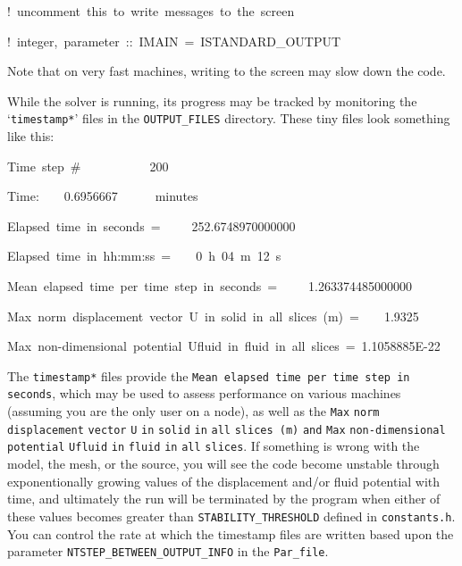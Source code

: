 \documentclass[oneside,english]{book}
\newenvironment{lyxcode}
{\begin{list}{}{
\setlength{\rightmargin}{\leftmargin}
\setlength{\listparindent}{0pt}%
\raggedright
\setlength{\itemsep}{0pt}
\setlength{\parsep}{0pt}
\normalfont\ttfamily}%
 \item[]}
{\end{list}}
\begin{document}
\begin{lyxcode}
!~uncomment~this~to~write~messages~to~the~screen~

!~integer,~parameter~::~IMAIN~=~ISTANDARD\_OUTPUT~
\end{lyxcode}
Note that on very fast machines, writing to the screen may slow down
the code.

While the solver is running, its progress may be tracked by monitoring
the `\texttt{timestamp{*}}' files in the \texttt{OUTPUT\_FILES} directory.
These tiny files look something like this:

\begin{lyxcode}
Time~step~\#~~~~~~~~~~~200~

Time:~~~~0.6956667~~~~~~minutes~

Elapsed~time~in~seconds~=~~~~~252.6748970000000~

Elapsed~time~in~hh:mm:ss~=~~~~0~h~04~m~12~s~

Mean~elapsed~time~per~time~step~in~seconds~=~~~~~1.263374485000000~

Max~norm~displacement~vector~U~in~solid~in~all~slices~(m)~=~~~~1.9325~

Max~non-dimensional~potential~Ufluid~in~fluid~in~all~slices~=~1.1058885E-22~
\end{lyxcode}
The \texttt{timestamp{*}} files provide the \texttt{Mean elapsed time
per time step in seconds}, which may be used to assess performance
on various machines (assuming you are the only user on a node), as
well as the \texttt{\small Max}{\small{} }\texttt{\small norm}{\small{}
}\texttt{\small displacement}{\small{} }\texttt{\small vector}{\small{}
}\texttt{\small U}{\small{} }\texttt{\small in}{\small{} }\texttt{\small solid}{\small{}
}\texttt{\small in}{\small{} }\texttt{\small all}{\small{} }\texttt{\small slices~(m)}{\small{}
}\texttt{\small and}{\small{} }\texttt{\small Max}{\small{} }\texttt{\small non-dimensional}{\small{}
}\texttt{\small potential}{\small{} }\texttt{\small Ufluid}{\small{}
}\texttt{\small in}{\small{} }\texttt{\small fluid}{\small{} }\texttt{\small in}{\small{}
}\texttt{\small all}{\small{} }\texttt{\small slices}. If something
is wrong with the model, the mesh, or the source, you will see the
code become unstable through exponentionally growing values of the
displacement and/or fluid potential with time, and ultimately the
run will be terminated by the program when either of these values
becomes greater than \texttt{STABILITY\_THRESHOLD} defined in \texttt{constants.h}.
You can control the rate at which the timestamp files are written
based upon the parameter \texttt{NTSTEP\_BETWEEN\_OUTPUT\_INFO} in
the \texttt{Par\_file}.
\end{document}
